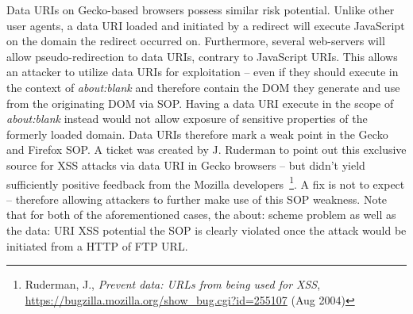     Data URIs on Gecko-based browsers possess similar risk potential. Unlike other user agents, a data URI loaded and initiated by a redirect will execute JavaScript on the domain the redirect occurred on. Furthermore, several web-servers will allow pseudo-redirection to data URIs, contrary to JavaScript URIs. This allows an attacker to utilize data URIs for exploitation -- even if they should execute in the context of \textit{about:blank} and therefore contain the DOM they generate and use from the originating DOM via SOP. Having a data URI execute in the scope of \textit{about:blank} instead would not allow exposure of sensitive properties of the formerly loaded domain. Data URIs therefore mark a weak point in the Gecko and Firefox SOP. A ticket was created by J. Ruderman to point out this exclusive source for XSS attacks via data URI in Gecko browsers -- but didn't yield sufficiently positive feedback from the Mozilla developers~\footnote{Ruderman, J., \textit{Prevent data: URLs from being used for XSS}, \url{https://bugzilla.mozilla.org/show_bug.cgi?id=255107} (Aug 2004)}. A fix is not to expect -- therefore allowing attackers to further make use of this SOP weakness. Note that for both of the aforementioned cases, the about: scheme problem as well as the data: URI XSS potential the SOP is clearly violated once the attack would be initiated from a HTTP of FTP URL.\\

